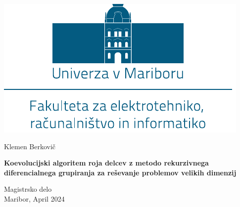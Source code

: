 \documentclass[openany, a4paper, 12pt]{book}
\newcommand{\aauthor}{Klemen Berkovi\v{c}}
\newcommand{\atitleslo}{Koevolucijski algoritem roja delcev z metodo rekurzivnega diferencialnega grupiranja za reševanje problemov velikih dimenzij}
\newcommand{\atype}{Magistrsko delo}
\newcommand{\adate}{Maribor, April 2024}
\begin{document}
\pagestyle{empty} %

\newpage
\begin{center}
\includegraphics[scale=0.9]{img/logo-um-feri.pdf} %
\vspace{3cm}

{\LARGE \aauthor\\} %
\vspace{9.5mm}

{\bf \huge \MakeUppercase \atitleslo}\\ %
\vspace{9mm}

{\LARGE \atype}\\ %
\vspace{8.5cm}
{\LARGE \adate}\\ %
\end{center}
\end{document}
